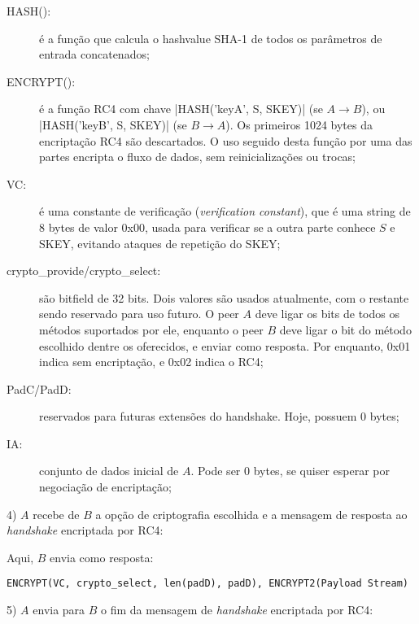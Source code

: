 \begin{description}
    \item[HASH():] é a função que calcula o \gls*{hashvalue} SHA-1 de todos os
        parâmetros de entrada concatenados;

    \item[ENCRYPT():] é a função RC4 com chave \bverb|HASH('keyA', S, SKEY)| (se
        $A \rightarrow B$), ou \bverb|HASH('keyB', S, SKEY)| (se $B \rightarrow A$). Os
        primeiros 1024 bytes da encriptação RC4 são descartados. O uso seguido desta
        função por uma das partes encripta o fluxo de dados, sem reinicializações ou
        trocas;

    \item[VC:] é uma constante de verificação (\emph{verification constant}), que é uma
        string de 8 bytes de valor 0x00, usada para verificar se a outra parte conhece
        $S$ e SKEY, evitando ataques de repetição do SKEY;

    \item[crypto\_provide/crypto\_select:] são bitfield de 32 bits. Dois valores são
        usados atualmente, com o restante sendo reservado para uso futuro. O \gls*{peer}
        $A$ deve ligar os bits de todos os métodos suportados por ele, enquanto o
        \gls*{peer} $B$ deve ligar o bit do método escolhido dentre os oferecidos, e
        enviar como resposta. Por enquanto, 0x01 indica sem encriptação, e 0x02 indica o
        RC4;

    \item[PadC/PadD:] reservados para futuras extensões do handshake. Hoje, possuem 0
         bytes;

    \item[IA:] conjunto de dados inicial de $A$. Pode ser 0 bytes, se quiser esperar por
        negociação de encriptação;
\end{description}


4) $A$ recebe de $B$ a opção de criptografia escolhida e a mensagem de resposta ao
\emph{handshake} encriptada por RC4:

Aqui, $B$ envia como resposta:

\begin{verbatim}
ENCRYPT(VC, crypto_select, len(padD), padD), ENCRYPT2(Payload Stream)
\end{verbatim}


5) $A$ envia para $B$ o fim da mensagem de \emph{handshake} encriptada por RC4:

